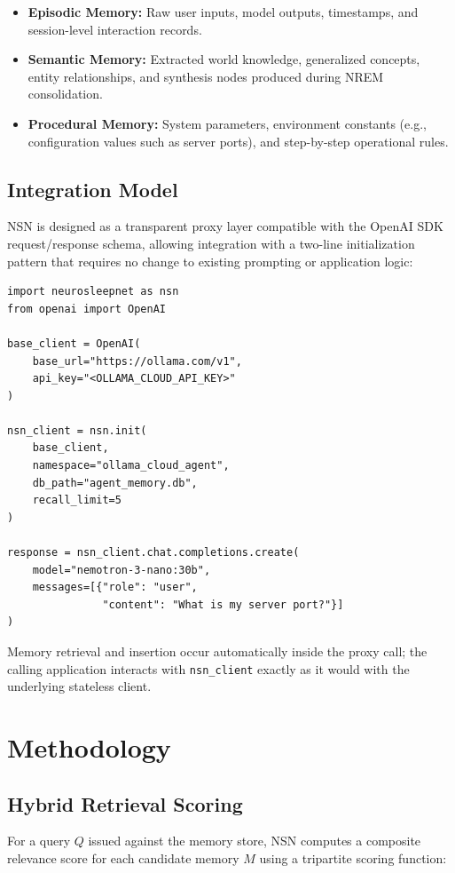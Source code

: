 \documentclass[conference]{IEEEtran}
\begin{document}
\begin{itemize}
    \item \textbf{Episodic Memory:} Raw user inputs, model outputs, timestamps, and session-level interaction records.
    \item \textbf{Semantic Memory:} Extracted world knowledge, generalized concepts, entity relationships, and synthesis nodes produced during NREM consolidation.
    \item \textbf{Procedural Memory:} System parameters, environment constants (e.g., configuration values such as server ports), and step-by-step operational rules.
\end{itemize}

\subsection{Integration Model}
NSN is designed as a transparent proxy layer compatible with the OpenAI SDK request/response schema, allowing integration with a two-line initialization pattern that requires no change to existing prompting or application logic:

\begin{lstlisting}
import neurosleepnet as nsn
from openai import OpenAI

base_client = OpenAI(
    base_url="https://ollama.com/v1",
    api_key="<OLLAMA_CLOUD_API_KEY>"
)

nsn_client = nsn.init(
    base_client,
    namespace="ollama_cloud_agent",
    db_path="agent_memory.db",
    recall_limit=5
)

response = nsn_client.chat.completions.create(
    model="nemotron-3-nano:30b",
    messages=[{"role": "user",
               "content": "What is my server port?"}]
)
\end{lstlisting}

Memory retrieval and insertion occur automatically inside the proxy call; the calling application interacts with \texttt{nsn\_client} exactly as it would with the underlying stateless client.

\section{Methodology}

\subsection{Hybrid Retrieval Scoring}
For a query $Q$ issued against the memory store, NSN computes a composite relevance score for each candidate memory $M$ using a tripartite scoring function:
\end{document}
